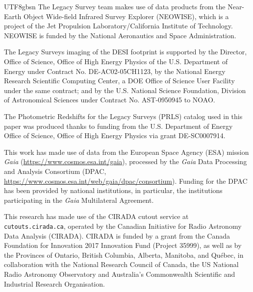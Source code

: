 \documentclass[twocolumn,linenumbers]{aastex631}
\begin{document}
\begin{CJK*}{UTF8}{gbsn}
The Legacy Survey team makes use of data products from the Near-Earth Object Wide-field Infrared Survey Explorer (NEOWISE), which is a project of the Jet Propulsion Laboratory/California Institute of Technology. NEOWISE is funded by the National Aeronautics and Space Administration.

The Legacy Surveys imaging of the DESI footprint is supported by the Director, Office of Science, Office of High Energy Physics of the U.S. Department of Energy under Contract No. DE-AC02-05CH1123, by the National Energy Research Scientific Computing Center, a DOE Office of Science User Facility under the same contract; and by the U.S. National Science Foundation, Division of Astronomical Sciences under Contract No. AST-0950945 to NOAO.

The Photometric Redshifts for the Legacy Surveys (PRLS) catalog used in this paper was produced thanks to funding from the U.S. Department of Energy Office of Science, Office of High Energy Physics via grant DE-SC0007914.

This work has made use of data from the European Space Agency (ESA) mission
{\it Gaia} (\url{https://www.cosmos.esa.int/gaia}), processed by the {\it Gaia}
Data Processing and Analysis Consortium (DPAC,
\url{https://www.cosmos.esa.int/web/gaia/dpac/consortium}). Funding for the DPAC
has been provided by national institutions, in particular, the institutions
participating in the {\it Gaia} Multilateral Agreement.

This research has made use of the CIRADA cutout service at \texttt{cutouts.cirada.ca}, operated by the Canadian Initiative for Radio Astronomy Data Analysis (CIRADA). CIRADA is funded by a grant from the Canada Foundation for Innovation 2017 Innovation Fund (Project 35999), as well as by the Provinces of Ontario, British Columbia, Alberta, Manitoba, and Qu\'ebec, in collaboration with the National Research Council of Canada, the US National Radio Astronomy Observatory and Australia’s Commonwealth Scientific and Industrial Research Organisation. 
\vspace{5mm}

\appendix

\end{CJK*}
\end{document}
